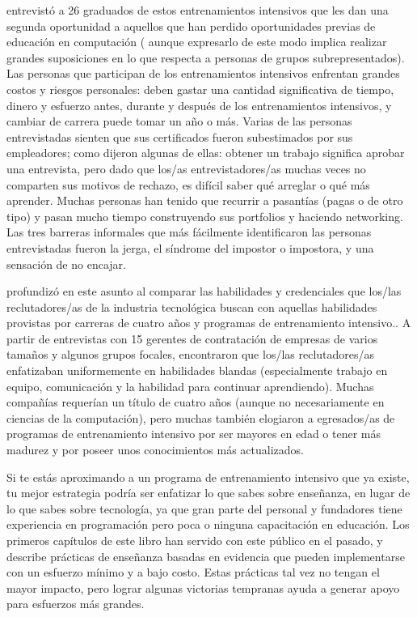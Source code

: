 \cite{Thay2017} entrevistó a 26 graduados de estos entrenamientos intensivos
que les dan una segunda oportunidad a aquellos que han perdido oportunidades previas de educación en computación
( aunque expresarlo de este modo implica realizar grandes suposiciones 
en lo que respecta a  personas de grupos subrepresentados).
Las personas que participan de los entrenamientos intensivos enfrentan grandes costos y riesgos personales:
deben gastar una cantidad significativa de tiempo, dinero y esfuerzo antes, durante y después de los entrenamientos intensivos, y cambiar de carrera puede tomar un año o más.
Varias de las personas entrevistadas sienten que sus certificados fueron subestimados por sus empleadores;
como dijeron algunas de ellas:
obtener un trabajo significa aprobar una entrevista,
pero dado que los/as entrevistadores/as muchas veces no comparten sus motivos de rechazo,
es difícil saber qué arreglar o qué más aprender.
Muchas personas han tenido que recurrir a pasantías (pagas o de otro tipo)
y pasan mucho tiempo construyendo sus portfolios y haciendo networking.
Las tres barreras informales que más fácilmente identificaron las personas entrevistadas fueron la jerga,
el síndrome del impostor o impostora, y una sensación de no encajar.

\cite{Burk2018} profundizó en este asunto
al comparar las habilidades y credenciales que los/las reclutadores/as de la industria tecnológica buscan con aquellas habilidades provistas por carreras de cuatro años y programas de entrenamiento intensivo..
A partir de entrevistas con 15 gerentes de contratación de empresas de varios tamaños y algunos grupos focales,
encontraron que los/las reclutadores/as enfatizaban uniformemente en habilidades blandas
(especialmente trabajo en equipo, comunicación y la habilidad para continuar aprendiendo).
Muchas compañías requerían un título de cuatro años
(aunque no necesariamente en ciencias de la computación),
pero muchas también elogiaron a egresados/as de programas de  entrenamiento intensivo por ser mayores en edad o tener más madurez
y por poseer unos conocimientos más actualizados.

Si te estás aproximando a un programa de entrenamiento intensivo que ya existe,
tu mejor estrategia podría ser enfatizar lo que sabes sobre enseñanza,
en lugar de lo que sabes sobre tecnología,
ya que gran parte del personal y fundadores tiene experiencia en programación
pero poca o ninguna capacitación en educación.
Los primeros capítulos de este libro han servido con este público en el pasado, 
y ~\cite{Lang2016} describe
prácticas de enseñanza basadas en evidencia que pueden implementarse
con un esfuerzo mínimo y a bajo costo.
Estas prácticas tal vez no tengan el mayor impacto, 
pero lograr algunas victorias tempranas ayuda a generar apoyo para esfuerzos más grandes.


